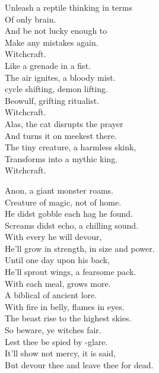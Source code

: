 Unleash a reptile thinking in terms \\
Of only  brain. \\
And be not lucky enough to \\
Make any mistakes again. \\
Witchcraft. \\

Like a grenade in a fist. \\
The air ignites, a bloody mist. \\
 cycle shifting, demon lifting. \\
Beowulf, grifting ritualist. \\
Witchcraft. \\

Alas, the cat disrupts the prayer \\
And turns it on meekest there. \\
The tiny creature, a harmless skink, \\
Transforms into a mythic king. \\
Witchcraft. \\




Anon, a giant monster roams. \\
Creature of magic, not of home. \\
He didst gobble each hag he found. \\
Screams didst echo, a chilling sound. \\
With every  he will devour, \\
He'll grow in strength, in size and power. \\
Until one day upon his back, \\
He'll sprout wings, a fearsome pack. \\

With each meal,  grows more. \\
A biblical  of ancient lore. \\
With fire in belly, flames in eyes. \\
The beast rise to the highest skies. \\
So beware, ye witches fair. \\
Lest thee be spied by -glare. \\
It'll show not mercy, it is said, \\
But devour thee and leave thee for dead. \\

